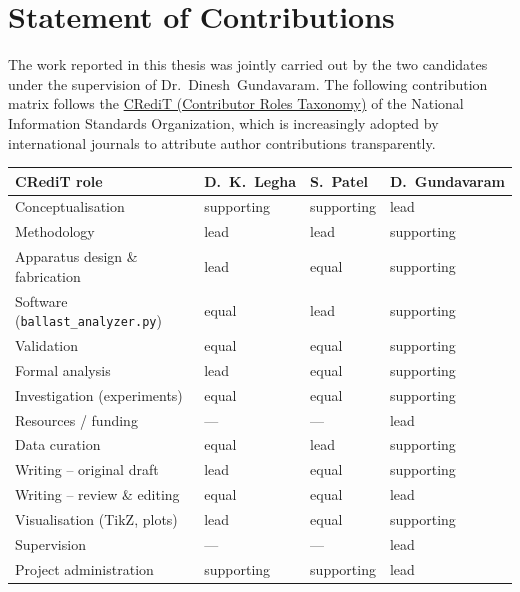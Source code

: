\cleardoublepage
\chapter*{Statement of Contributions}
\thispagestyle{plain}

\begingroup
\setlength{\parindent}{0pt}

The work reported in this thesis was jointly carried out by the two
candidates under the supervision of Dr.~Dinesh~Gundavaram. The
following contribution matrix follows the
\href{https://credit.niso.org/}{CRediT (Contributor Roles Taxonomy)} of
the National Information Standards Organization, which is
increasingly adopted by international journals to attribute author
contributions transparently.

\bigskip

{\footnotesize
\renewcommand{\arraystretch}{1.18}
\begin{tabularx}{\textwidth}{|>{\raggedright\arraybackslash}p{}|>{\centering\arraybackslash}X|>{\centering\arraybackslash}X|>{\centering\arraybackslash}X|}
\hline
\headrow
\textbf{\color{white}CRediT role} & \textbf{\color{white}D.~K.~Legha} &
\textbf{\color{white}S.~Patel} & \textbf{\color{white}D.~Gundavaram} \\
\hline
Conceptualisation             & supporting & supporting & lead       \\
Methodology                   & lead       & lead       & supporting \\
Apparatus design \& fabrication & lead     & equal      & supporting \\
Software (\texttt{ballast\_analyzer.py}) & equal & lead & supporting \\
Validation                    & equal      & equal      & supporting \\
Formal analysis               & lead       & equal      & supporting \\
Investigation (experiments)   & equal      & equal      & supporting \\
Resources / funding           & ---        & ---        & lead       \\
Data curation                 & equal      & lead       & supporting \\
Writing -- original draft     & lead       & equal      & supporting \\
Writing -- review \& editing  & equal      & equal      & lead       \\
Visualisation (TikZ, plots)   & lead       & equal      & supporting \\
Supervision                   & ---        & ---        & lead       \\
Project administration        & supporting & supporting & lead       \\
\hline
\end{tabularx}}

